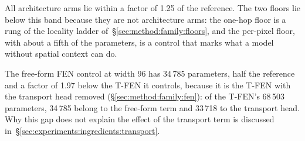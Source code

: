 All architecture arms lie within a factor of 1.25 of the reference. The two
floors lie below this band because they are not architecture arms: the
one-hop floor is a rung of the locality ladder
of~\S\ref{sec:method:family:floors}, and the per-pixel floor, with about a
fifth of the parameters, is a control that marks what a model without
spatial context can do.

The free-form FEN control at width 96 has 34\,785 parameters, half the
reference and a factor of 1.97 below the T-FEN it controls, because it is
the T-FEN with the transport head removed (\S\ref{sec:method:family:fen}):
of the T-FEN's 68\,503 parameters, 34\,785 belong to the free-form term and
33\,718 to the transport head. Why this gap does not explain the
effect of the transport term is discussed
in~\S\ref{sec:experiments:ingredients:transport}.

